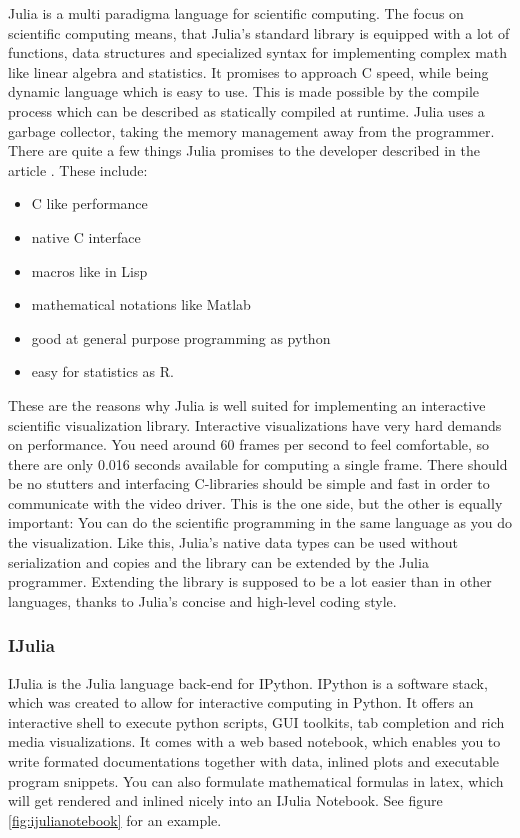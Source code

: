 Julia is a multi paradigma language for scientific computing.
The focus on scientific computing means, that Julia's standard library is equipped with a lot of functions, data structures and specialized syntax for implementing complex math like linear algebra and statistics.
It promises to approach C speed, while being dynamic language which is easy to use.
This is made possible by the compile process which can be described as statically compiled at runtime.
Julia uses a garbage collector, taking the memory management away from the programmer.
There are quite a few things Julia promises to the developer described in the article \cite{WhyJulia}.
These include:
\begin{itemize}
	\item C like performance
	\item native C interface
	\item macros like in Lisp
	\item mathematical notations like Matlab
	\item good at general purpose programming as python
	\item easy for statistics as R.
\end{itemize}
These are the reasons why Julia is well suited for implementing an interactive scientific visualization library.
Interactive visualizations have very hard demands on performance. 
You need around 60 frames per second to feel comfortable, so there are only 0.016 seconds available for computing a single frame.
There should be no stutters and interfacing C-libraries should be simple and fast in order to communicate with the video driver.
This is the one side, but the other is equally important:
You can do the scientific programming in the same language as you do the visualization.
Like this, Julia's native data types can be used without serialization and copies and the library can be extended by the Julia programmer.
Extending the library is supposed to be a lot easier than in other languages, thanks to Julia's concise and high-level coding style.


\subsubsection{IJulia}
IJulia is the Julia language back-end for IPython.
IPython is a software stack, which was created to allow for interactive computing in Python.
It offers an interactive shell to execute python scripts, \ac{GUI} toolkits, tab completion and rich media visualizations.
It comes with a web based notebook, which enables you to write formated documentations together with data, inlined plots and executable program snippets. You can also formulate mathematical formulas in latex, which will get rendered and inlined nicely into an IJulia Notebook.
See figure \ref{fig:ijulianotebook} for an example.

